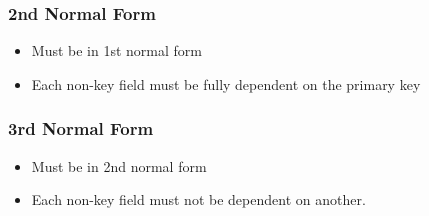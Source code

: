 \subsubsection*{2nd Normal Form}

\begin{itemize}
    \item Must be in 1st normal form
    \item Each non-key field must be fully dependent on the primary key
\end{itemize}

\subsubsection*{3rd Normal Form}

\begin{itemize}
    \item Must be in 2nd normal form
    \item Each non-key field must not be dependent on another.
\end{itemize}